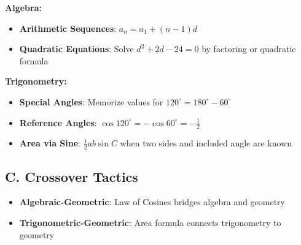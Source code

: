 \documentclass[12pt]{article}
\begin{document}
\begin{tacticalbox}
\textbf{Algebra:}
\begin{itemize}[leftmargin=*]
    \item \textbf{Arithmetic Sequences}: $a_n = a_1 + (n-1)d$
    \item \textbf{Quadratic Equations}: Solve $d^2 + 2d - 24 = 0$ by factoring or quadratic formula
\end{itemize}

\textbf{Trigonometry:}
\begin{itemize}[leftmargin=*]
    \item \textbf{Special Angles}: Memorize values for $120^\circ = 180^\circ - 60^\circ$
    \item \textbf{Reference Angles}: $\cos 120^\circ = -\cos 60^\circ = -\frac{1}{2}$
    \item \textbf{Area via Sine}: $\frac{1}{2}ab\sin C$ when two sides and included angle are known
\end{itemize}

\subsection*{C. Crossover Tactics}
\begin{itemize}[leftmargin=*]
    \item \textbf{Algebraic-Geometric}: Law of Cosines bridges algebra and geometry
    \item \textbf{Trigonometric-Geometric}: Area formula connects trigonometry to geometry
\end{itemize}
\end{tacticalbox}
\end{document}
